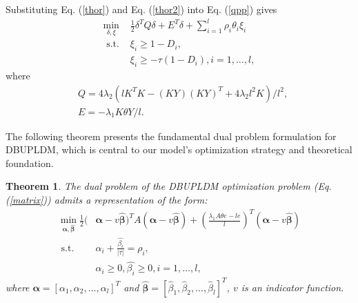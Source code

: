 \documentclass[a4paper]{cas-sc}
\newtheorem{myTheo}{Theorem}
\begin{document}


Substituting Eq. (\ref{thor}) and Eq. (\ref{thor2}) into Eq. (\ref{qpp}) gives
\begin{equation}
\label{matrix}
\begin{aligned}
\min _{\delta, \xi} & \frac{1}{2} \delta^{T} Q \delta+E^{T} \delta+\sum_{i=1}^{l} \rho_{i}\theta_{i}  \xi_{i} \\
\text { s.t. } & \xi_{i} \geq 1-D_{i}, \\
& \xi_{i} \geq-\tau\left(1-D_{i}\right), i=1, \ldots, l,
\end{aligned}
\end{equation}
where 
\begin{equation}
\label{computeQE}
\begin{aligned}
&Q=4 \lambda_{2}\left(l K^{T} K-(K Y)(K Y)^{T}+4 \lambda_{2} l^{2} K\right) / l^{2}, \\
&E=-\lambda_{1} K\mathbb{\theta}Y / l.
\end{aligned}
\end{equation}

The following theorem presents the fundamental dual problem formulation for DBUPLDM, which is central to our model's optimization strategy and theoretical foundation.

\begin{myTheo}
\label{theo2}
The dual problem of the DBUPLDM optimization problem (Eq. (\ref{matrix})) admits a representation of the form: 
\begin{equation}
\label{dual}
\begin{aligned}
\min _{\boldsymbol{\alpha, \hat{\beta}}} \frac{1}{2}( & \boldsymbol{\alpha}-v \boldsymbol{\hat{\beta}})^{T} A(\boldsymbol{\alpha}-v \boldsymbol{\hat{\beta}})+\left(\frac{\lambda_{1} A\mathbb{\theta}e-l e}{l}\right)^{T}(\boldsymbol{\alpha}-v \boldsymbol{\hat{\beta}}) \\
\text { s.t. } \quad & \alpha_{i}+\frac{\hat{\beta_{i}}}{|\tau|}=\rho_{i}, \\
& \alpha_{i} \geq 0, \hat{\beta_{i}} \geq 0, i=1, \ldots, l,
\end{aligned}
\end{equation}
where $\boldsymbol{\alpha}=[\alpha_{1},\alpha_{2},...,\alpha_{l}]^{T}$ and $\boldsymbol{\hat{\beta}}=[\hat{\beta}_{1},\hat{\beta}_{2},...,\hat{\beta}_{l}]^{T}$, $v$ is an indicator function.
\end{myTheo}
\end{document}
